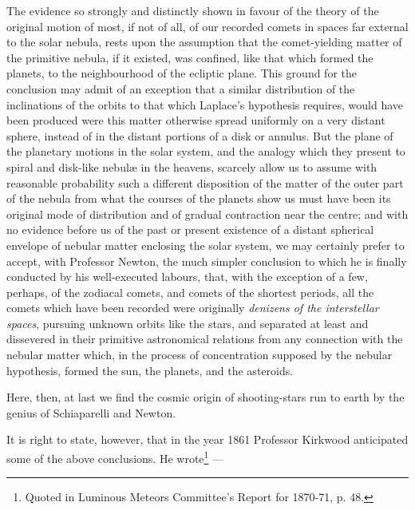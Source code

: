 \documentclass[a4paper, 12pt, oneside, polutonikogreek, english]{article}
\begin{document}
The evidence so strongly and distinctly shown in favour of the theory of the original motion of most, if not of all, of our recorded comets in spaces far external to the solar nebula, rests upon the assumption that the comet-yielding matter of the primitive nebula, if it existed, was confined, like that which formed the planets, to the neighbourhood of the ecliptic plane. This ground for the conclusion may admit of an exception that a similar distribution of the inclinations of the orbits to that which Laplace's hypothesis requires, would have been produced were this matter otherwise spread uniformly on a very distant sphere, instead of in the distant portions of a disk or annulus. But the plane of the planetary motions in the solar system, and the analogy which they present to spiral and disk-like nebulæ in the heavens, scarcely allow us to assume with reasonable probability such a different disposition of the matter of the outer part of the nebula from what the courses of the planets show us must have been its original mode of distribution and of gradual contraction near the centre; and with no evidence before us of the past or present existence of a distant spherical envelope of nebular matter enclosing the solar system, we may certainly prefer to accept, with Professor Newton, the much simpler conclusion to which he is finally conducted by his well-executed labours, that, with the exception of a few, perhaps, of the zodiacal comets, and comets of the shortest periods, all the comets which have been recorded were originally \emph{denizens of the interstellar spaces}, pursuing unknown orbits like the stars, and separated at least and dissevered in their primitive astronomical relations from any connection with the nebular matter which, in the process of concentration supposed by the nebular hypothesis, formed the sun, the planets, and the asteroids.

Here, then, at last we find the cosmic origin of shooting-stars run to earth by the genius of Schiaparelli and Newton.

It is right to state, however, that in the year 1861 Professor Kirkwood anticipated some of the above conclusions. He wrote\footnote{Quoted in Luminous Meteors Committee's Report for 1870-71, p. 48.} ---
\end{document}
